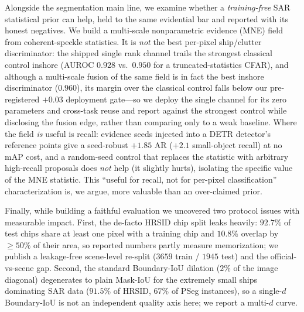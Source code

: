 \documentclass[journal]{IEEEtran}
\begin{document}
Alongside the segmentation main line, we examine whether a \emph{training-free} SAR statistical prior can help, held to the same evidential bar and reported with its honest negatives. We build a multi-scale nonparametric evidence (MNE) field from coherent-speckle statistics. It is \emph{not} the best per-pixel ship/clutter discriminator: the shipped single rank channel trails the strongest classical control inshore (AUROC $0.928$ vs.\ $0.950$ for a truncated-statistics CFAR), and although a multi-scale fusion of the same field is in fact the best inshore discriminator ($0.960$), its margin over the classical control falls below our pre-registered $+0.03$ deployment gate---so we deploy the single channel for its zero parameters and cross-task reuse and report against the strongest control while disclosing the fusion edge, rather than comparing only to a weak baseline. Where the field \emph{is} useful is recall: evidence seeds injected into a DETR detector's reference points give a seed-robust $+1.85$ AR ($+2.1$ small-object recall) at no mAP cost, and a random-seed control that replaces the statistic with arbitrary high-recall proposals does \emph{not} help (it slightly hurts), isolating the specific value of the MNE statistic. This ``useful for recall, not for per-pixel classification'' characterization is, we argue, more valuable than an over-claimed prior.

Finally, while building a faithful evaluation we uncovered two protocol issues with measurable impact. First, the de-facto HRSID chip split leaks heavily: $92.7\%$ of test chips share at least one pixel with a training chip and $10.8\%$ overlap by $\ge\!50\%$ of their area, so reported numbers partly measure memorization; we publish a leakage-free scene-level re-split ($3659$ train / $1945$ test) and the official-vs-scene gap. Second, the standard Boundary-IoU dilation ($2\%$ of the image diagonal) degenerates to plain Mask-IoU for the extremely small ships dominating SAR data ($91.5\%$ of HRSID, $67\%$ of PSeg instances), so a single-$d$ Boundary-IoU is not an independent quality axis here; we report a multi-$d$ curve.
\end{document}

